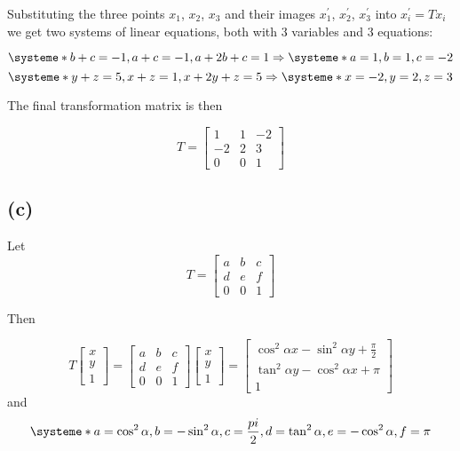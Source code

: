\documentclass[paper=a4, fontsize=11pt]{scrartcl} %
\numberwithin{equation}{section} %
\numberwithin{figure}{section} %
\numberwithin{table}{section} %
\begin{document}
Substituting the three points $x_1$, $x_2$, $x_3$ and their images
$x^\prime_1$, $x^\prime_2$, $x^\prime_3$ into $x^\prime_i = Tx_i$ we get two
systems of linear equations, both with 3 variables and 3 equations:

\[
  \systeme*{b + c = -1, a + c = -1, a + 2b + c = 1}
  \Rightarrow
  \systeme*{a = 1, b = 1, c = -2}
\]
\[
  \systeme*{y + z = 5, x + z = 1, x + 2y + z = 5}
  \Rightarrow
  \systeme*{x = -2, y = 2, z = 3}
\]

The final transformation matrix is then

\[
  T =
  \begin{bmatrix}
    1 & 1 & -2 \\
    -2 & 2 & 3 \\
    0 & 0 & 1
  \end{bmatrix}
\]

\subsection*{(c)}

Let
\[
  T = 
  \begin{bmatrix}
    a & b & c \\
    d & e & f \\
    0 & 0 & 1
  \end{bmatrix}
\]

Then

\[
  T
  \begin{bmatrix}
    x \\
    y \\
    1
  \end{bmatrix}
  =
  \begin{bmatrix}
    a & b & c \\
    d & e & f \\
    0 & 0 & 1
  \end{bmatrix}
  \begin{bmatrix}
    x \\
    y \\
    1
  \end{bmatrix}
  =
  \begin{bmatrix}
    \cos^2\alpha x - \sin^2\alpha y + \frac{\pi}{2}\\
    \tan^2\alpha y - \cos^2\alpha x + \pi\\
    1
  \end{bmatrix}
\]
and
\[
  \systeme*{a = \cos^2\alpha, b = -\sin^2\alpha, c = \frac{pi}{2}, d = \tan^2\alpha, e = -\cos^2\alpha, f = \pi}
\]
\end{document}
